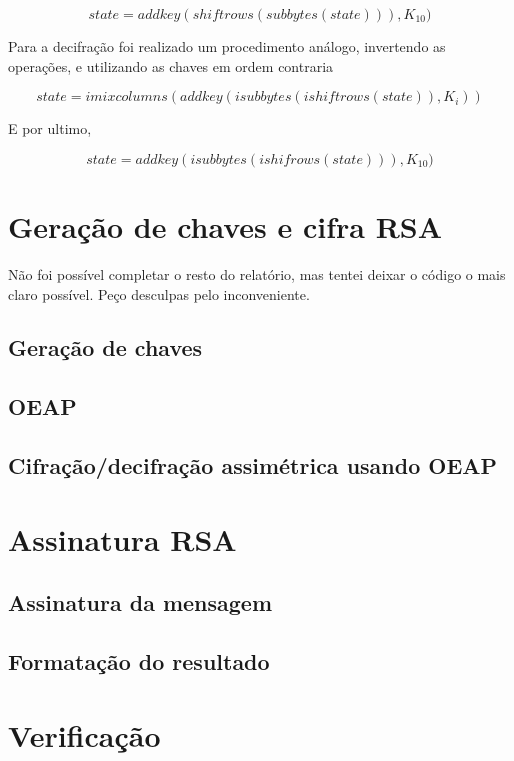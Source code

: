 \documentclass[11pt]{article}
\begin{document}
$$
state = addkey(shiftrows(subbytes(state))), K_{10})
$$

Para a decifração foi realizado um procedimento análogo, invertendo as operações, e utilizando as chaves em ordem contraria

$$
state =  imixcolumns(addkey(isubbytes(ishiftrows(state)), K_i))
$$

E por ultimo, 

$$
state = addkey(isubbytes(ishifrows(state))), K_{10})
$$

\section{Geração de chaves e cifra RSA}
\label{sec:org807d8d9}
Não foi possível completar o resto do relatório, mas tentei deixar o código o mais claro possível. Peço desculpas pelo inconveniente.
\subsection{Geração de chaves}
\label{sec:org3ae0cbb}
\subsection{OEAP}
\label{sec:org8b04d21}
\subsection{Cifração/decifração assimétrica usando OEAP}
\label{sec:org1f0268d}
\section{Assinatura RSA}
\label{sec:org6aa2cf2}
\subsection{Assinatura da mensagem}
\label{sec:org2be41c4}
\subsection{Formatação do resultado}
\label{sec:orgc5fcdeb}
\section{Verificação}
\label{sec:org40b006c}
\end{document}
